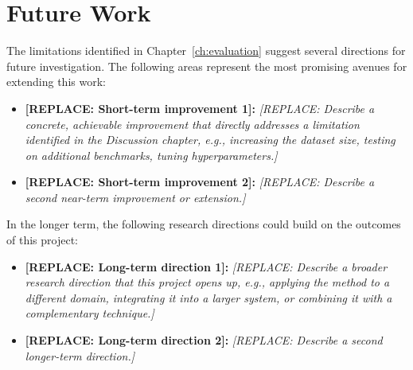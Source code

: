 \section{Future Work}
\label{sec:future_work}



The limitations identified in Chapter~\ref{ch:evaluation} suggest several 
directions for future investigation. The following areas represent the most 
promising avenues for extending this work:

\begin{itemize}
    \item \textbf{[REPLACE: Short-term improvement 1]:} \textit{[REPLACE: 
    Describe a concrete, achievable improvement that directly addresses a 
    limitation identified in the Discussion chapter, e.g., increasing the 
    dataset size, testing on additional benchmarks, tuning hyperparameters.]}

    \item \textbf{[REPLACE: Short-term improvement 2]:} \textit{[REPLACE: 
    Describe a second near-term improvement or extension.]}
\end{itemize}

In the longer term, the following research directions could build on the 
outcomes of this project:
\begin{itemize}
    \item \textbf{[REPLACE: Long-term direction 1]:} \textit{[REPLACE: 
    Describe a broader research direction that this project opens up, 
    e.g., applying the method to a different domain, integrating it into 
    a larger system, or combining it with a complementary technique.]}

    \item \textbf{[REPLACE: Long-term direction 2]:} \textit{[REPLACE: 
    Describe a second longer-term direction.]}
\end{itemize}

